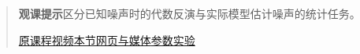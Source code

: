 \begin{quote}\small\textbf{观课提示}\quad 区分已知噪声时的代数反演与实际模型估计噪声的统计任务。

\href{https://www.youtube.com/watch?v=iv-5mZ_9CPY}{原课程视频}\quad\href{https://vitael04213.github.io/3blue1brown-notes/lessons/diffusion-models.html}{本节网页与媒体}\quad\href{https://vitael04213.github.io/3blue1brown-notes/lab.html\#noise}{参数实验}
\end{quote}
